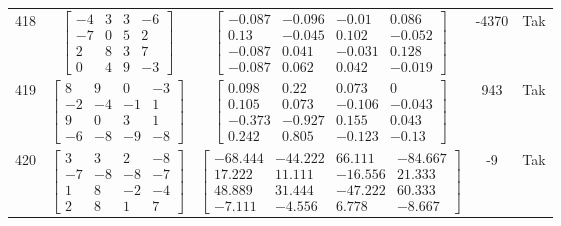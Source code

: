 \documentclass[a4paper,12pt]{article}
\begin{document}
\begin{tabular}{c c c c c}
418
&
$\begin{bmatrix} -4 & 3 & 3 & -6 \\ -7 & 0 & 5 & 2 \\ 2 & 8 & 3 & 7 \\ 0 & 4 & 9 & -3 \end{bmatrix}$
&
$\begin{bmatrix} -0.087 & -0.096 & -0.01 & 0.086 \\ 0.13 & -0.045 & 0.102 & -0.052 \\ -0.087 & 0.041 & -0.031 & 0.128 \\ -0.087 & 0.062 & 0.042 & -0.019 \end{bmatrix}$
&
-4370
&
Tak
\\
419
&
$\begin{bmatrix} 8 & 9 & 0 & -3 \\ -2 & -4 & -1 & 1 \\ 9 & 0 & 3 & 1 \\ -6 & -8 & -9 & -8 \end{bmatrix}$
&
$\begin{bmatrix} 0.098 & 0.22 & 0.073 & 0 \\ 0.105 & 0.073 & -0.106 & -0.043 \\ -0.373 & -0.927 & 0.155 & 0.043 \\ 0.242 & 0.805 & -0.123 & -0.13 \end{bmatrix}$
&
943
&
Tak
\\
420
&
$\begin{bmatrix} 3 & 3 & 2 & -8 \\ -7 & -8 & -8 & -7 \\ 1 & 8 & -2 & -4 \\ 2 & 8 & 1 & 7 \end{bmatrix}$
&
$\begin{bmatrix} -68.444 & -44.222 & 66.111 & -84.667 \\ 17.222 & 11.111 & -16.556 & 21.333 \\ 48.889 & 31.444 & -47.222 & 60.333 \\ -7.111 & -4.556 & 6.778 & -8.667 \end{bmatrix}$
&
-9
&
Tak
\\
\end{tabular} \egroup \newpage
\end{document}
